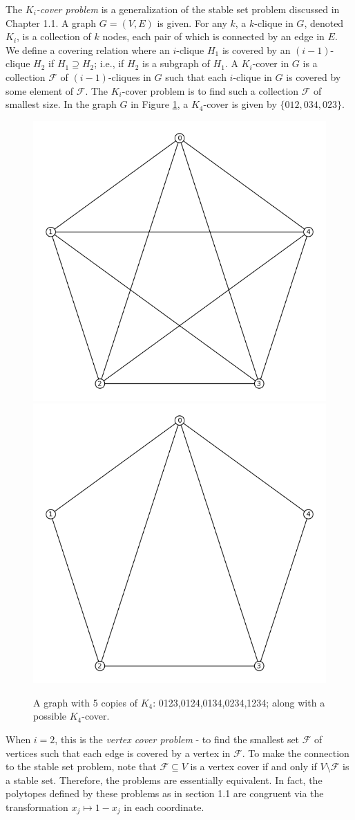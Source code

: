 The {\em $K_i$-cover problem} is a generalization of the stable set problem discussed in Chapter 1.1. 
A graph $G = (V,E)$ is given. 
For any $k$, a $k$-clique in $G$, denoted $K_i$, is a collection of $k$ nodes, each pair of which is connected by an edge in $E$.
We define a covering relation where an $i$-clique $H_1$ is covered by an $(i-1)$-clique $H_2$ if $H_1 \supseteq H_2$; i.e., if $H_2$ is a subgraph of $H_1$. 
A $K_i$-cover in $G$ is a collection $\mathcal{F}$ of $(i-1)$-cliques in $G$ such that each $i$-clique in $G$ is covered by some element of $\mathcal{F}$. 
The $K_i$-cover problem is to find such a collection $\mathcal{F}$ of smallest size.
In the graph $G$ in Figure \ref{K5}, a $K_4$-cover is given by $\{012,034,023\}$.

\begin{figure}[htd]
	\centering
	\includegraphics[width=.4\textwidth,natwidth=613,natheight=584]{K5.png}
	\includegraphics[width=.4\textwidth,natwidth=613,natheight=584]{K4cover.png}
	\caption{A graph with 5 copies of $K_4$: 0123,0124,0134,0234,1234; along with a possible $K_4$-cover.}
	\label{K5}
\end{figure}

When $i=2$, this is the \emph{vertex cover problem} - to find the smallest set $\mathcal{F}$ of vertices such that each edge is covered by a vertex in $\mathcal{F}$. 
To make the connection to the stable set problem, note that $\mathcal{F} \subseteq V$ is a vertex cover if and only if $V \setminus \mathcal{F}$ is a stable set.
Therefore, the problems are essentially equivalent.
In fact, the polytopes defined by these problems as in section 1.1 are congruent via the transformation $x_j \mapsto 1-x_j$ in each coordinate.

